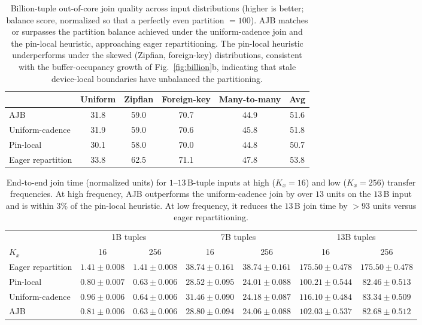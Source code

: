 \documentclass{article}
\begin{document}
\begin{table}[t]
\centering
\caption{Billion-tuple out-of-core join quality across input distributions
(higher is better; balance score, normalized so that a perfectly even partition
$= 100$). AJB matches or surpasses the partition balance achieved under the
uniform-cadence join and the pin-local heuristic, approaching eager
repartitioning. The pin-local heuristic underperforms under the skewed
(Zipfian, foreign-key) distributions, consistent with the buffer-occupancy
growth of Fig.~\ref{fig:billion}b, indicating that stale device-local boundaries
have unbalanced the partitioning.}
\label{tab:icl}
\begin{tabular}{lcccc|c}
\toprule
& Uniform & Zipfian & Foreign-key & Many-to-many & Avg \\
\midrule
AJB                & 31.8 & 59.0 & 70.7 & 44.9 & 51.6 \\
Uniform-cadence    & 31.9 & 59.0 & 70.6 & 45.8 & 51.8 \\
Pin-local          & 30.1 & 58.0 & 70.0 & 44.8 & 50.7 \\
\midrule
Eager repartition  & 33.8 & 62.5 & 71.1 & 47.8 & 53.8 \\
\bottomrule
\end{tabular}
\end{table}

\begin{table}[t]
\centering
\caption{End-to-end join time (normalized units) for $1$--$13$\,B-tuple inputs at
high ($K_x = 16$) and low ($K_x = 256$) transfer frequencies. At high frequency,
AJB outperforms the uniform-cadence join by over $13$ units on the $13$\,B input
and is within $3\%$ of the pin-local heuristic. At low frequency, it reduces the
$13$\,B join time by $>93$ units versus eager repartitioning.}
\label{tab:wallclock}
\begin{tabular}{l|cc|cc|cc}
\toprule
& \multicolumn{2}{c|}{1B tuples} & \multicolumn{2}{c|}{7B tuples}
& \multicolumn{2}{c}{13B tuples} \\
$K_x$ & 16 & 256 & 16 & 256 & 16 & 256 \\
\midrule
Eager repartition & $1.41 \pm 0.008$ & $1.41 \pm 0.008$
& $38.74 \pm 0.161$ & $38.74 \pm 0.161$
& $175.50 \pm 0.478$ & $175.50 \pm 0.478$ \\
\midrule
Pin-local & $0.80 \pm 0.007$ & $0.63 \pm 0.006$
& $28.52 \pm 0.095$ & $24.01 \pm 0.088$
& $100.21 \pm 0.544$ & $82.46 \pm 0.513$ \\
Uniform-cadence & $0.96 \pm 0.006$ & $0.64 \pm 0.006$
& $31.46 \pm 0.090$ & $24.18 \pm 0.087$
& $116.10 \pm 0.484$ & $83.34 \pm 0.509$ \\
AJB & $0.81 \pm 0.006$ & $0.63 \pm 0.006$
& $28.80 \pm 0.094$ & $24.06 \pm 0.088$
& $102.03 \pm 0.537$ & $82.68 \pm 0.512$ \\
\bottomrule
\end{tabular}
\end{table}
\end{document}
